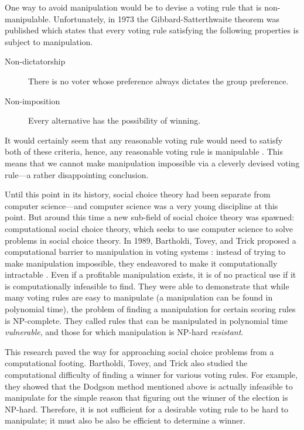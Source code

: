 	One way to avoid manipulation would be to devise a voting rule that is non-manipulable. Unfortunately, in 1973 the Gibbard-Satterthwaite theorem was published which states that every voting rule satisfying the following properties is subject to manipulation.
	\begin{description}
		\item[Non-dictatorship] There is no voter whose preference always dictates the group preference.
		\item[Non-imposition] Every alternative has the possibility of winning.
	\end{description}
	It would certainly seem that any reasonable voting rule would need to satisfy both of these criteria, hence, any reasonable voting rule is manipulable \cite{gibbard1973manipulation, satterthwaite1975strategy, duggan2000strategic}. This means that we cannot make manipulation impossible via a cleverly devised voting rule---a rather disappointing conclusion.

	Until this point in its history, social choice theory had been separate from computer science---and computer science was a very young discipline at this point. But around this time a new sub-field of social choice theory was spawned: computational social choice theory, which seeks to use computer science to solve problems in social choice theory. In 1989, Bartholdi, Tovey, and Trick proposed a computational barrier to manipulation in voting systems \cite{bartholdi1989computational}: instead of trying to make manipulation impossible, they endeavored to make it computationally intractable \cite{chevaleyre2007short}. Even if a profitable manipulation exists, it is of no practical use  if it is computationally infeasible to find. They were able to demonstrate that while many voting rules are easy to manipulate (a manipulation can be found in polynomial time), the problem of finding a manipulation for certain scoring rules is NP-complete. They called rules that can be manipulated in polynomial time \emph{vulnerable}, and those for which manipulation is NP-hard \emph{resistant}.

	This research paved the way for approaching social choice problems from a computational footing. Bartholdi, Tovey, and Trick also studied the computational difficulty of finding a winner for various voting rules. For example, they showed that the Dodgson method mentioned above \cite{dodgson1876method} is actually infeasible to manipulate for the simple reason that figuring out the winner of the election is NP-hard. Therefore, it is not sufficient for a desirable voting rule to be hard to manipulate; it must also be also be efficient to determine a winner.

